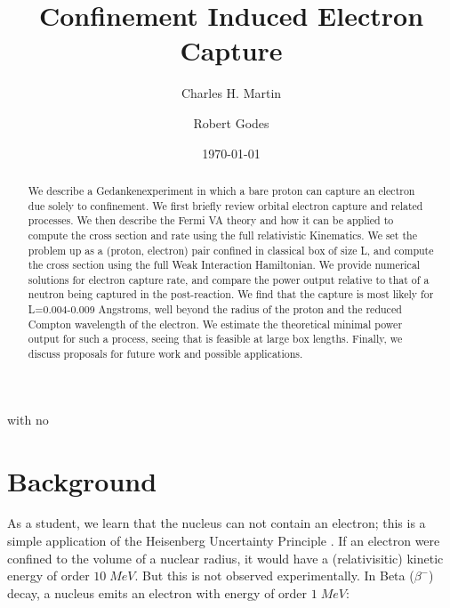 \documentclass[%
 aip,
 jmp,%
 amsmath,amssymb,
 reprint,%
]{revtex4-1}
\begin{document}

\title[]{Confinement Induced Electron Capture}

\author{Charles H. Martin}
with no\author{Robert Godes}%
%


\date{\today}%

\begin{abstract}
We describe a Gedankenexperiment in which a bare proton can capture an electron due solely to confinement. We first briefly review orbital electron capture and related processes.  We then describe the Fermi VA theory and how it can be applied to compute the cross section and rate using the full relativistic Kinematics.  We set the problem up as a (proton, electron) pair confined in classical box of size L, and compute the cross section using the full Weak Interaction Hamiltonian.  We provide numerical solutions for electron capture rate, and compare the power output relative to that of a neutron being captured in the post-reaction.  We find that the capture is most likely for L=0.004-0.009 Angstroms, well beyond the radius of the proton and the reduced Compton wavelength of the electron.  We estimate the theoretical minimal power output for such a process, seeing that is feasible at large box lengths.  Finally, we discuss proposals for future work and possible applications.
\end{abstract}

\maketitle

\section{Background}

As a student, we learn that the nucleus can not contain an electron; this is a simple application of the Heisenberg Uncertainty Principle \cite{Weisskopf}.  If an electron were confined to the volume of a nuclear radius, it would have a (relativisitic) kinetic energy of order $10\;MeV$.  But this is not observed experimentally.  In Beta ($\beta^{-}$) decay, a nucleus emits an electron with energy of order $1\;MeV$: 
\end{document}
